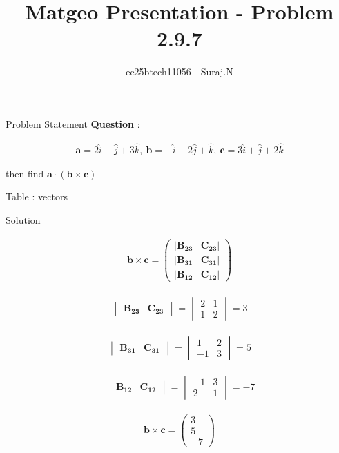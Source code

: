 \documentclass{beamer}
\title{Matgeo Presentation - Problem 2.9.7}
\author{ee25btech11056 - Suraj.N}
\numberwithin{equation}{section}
\theoremstyle{remark}
\newcommand{\myvec}[1]{\ensuremath{\begin{pmatrix}#1\end{pmatrix}}}
\newcommand{\mydet}[1]{\ensuremath{\begin{vmatrix}#1\end{vmatrix}}}
\let\vec\mathbf
\begin{document}
\begin{frame}
  \titlepage
\end{frame}

\begin{frame}{Problem Statement}
\textbf{Question} :  

\begin{align*}
\vec{a}=2\hat{i}+\hat{j}+3\hat{k},\ \vec{b}=-\hat{i}+2\hat{j}+\hat{k},\ \vec{c}=3\hat{i}+\hat{j}+2\hat{k}
\end{align*}

\begin{center}
then find \(\vec{a}\cdot(\vec{b}\times\vec{c})\)
\end{center}

\begin{table}[h!]
  \centering
  
  \caption*{Table : vectors}
  \label{2.9.7}
\end{table}

\end{frame}

\begin{frame}{Solution}

\begin{align*}
\vec{b} \times \vec{c} = 
\myvec{
|\vec{B_{23}} & \vec{C_{23}}| \\
|\vec{B_{31}} & \vec{C_{31}}| \\
|\vec{B_{12}} & \vec{C_{12}}|
}
\end{align*}

\begin{align*}
\mydet{\vec{B_{23}} & \vec{C_{23}}} = \mydet{2 & 1\\1 & 2} = 3
\end{align*}

\begin{align*}
\mydet{\vec{B_{31}} & \vec{C_{31}}} = \mydet{1 & 2\\-1 & 3} = 5
\end{align*}

\begin{align*}
\mydet{\vec{B_{12}} & \vec{C_{12}}} = \mydet{-1 & 3\\2 & 1} = -7
\end{align*}

\begin{align*}
  \vec{b} \times \vec{c} = \myvec{3\\5\\-7}
\end{align*}


\end{frame}
\end{document}
